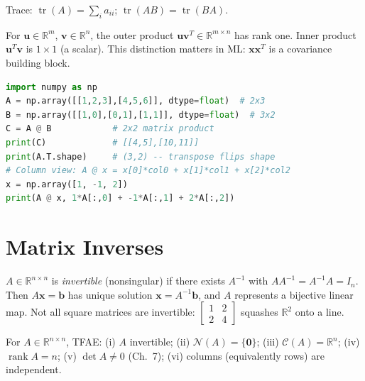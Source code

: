 Trace: $\operatorname{tr}(A)=\sum_i a_{ii}$; $\operatorname{tr}(AB)=\operatorname{tr}(BA)$.

\begin{example}
For $\mathbf{u}\in\mathbb{R}^m$, $\mathbf{v}\in\mathbb{R}^n$, the outer product $\mathbf{u}\mathbf{v}^T\in\mathbb{R}^{m\times n}$ has rank one. Inner product $\mathbf{u}^T\mathbf{v}$ is $1\times1$ (a scalar). This distinction matters in ML: $\mathbf{x}\mathbf{x}^T$ is a covariance building block.
\end{example}

\begin{example}
\begin{lstlisting}[language=Python]
import numpy as np
A = np.array([[1,2,3],[4,5,6]], dtype=float)  # 2x3
B = np.array([[1,0],[0,1],[1,1]], dtype=float)  # 3x2
C = A @ B            # 2x2 matrix product
print(C)             # [[4,5],[10,11]]
print(A.T.shape)     # (3,2) -- transpose flips shape
# Column view: A @ x = x[0]*col0 + x[1]*col1 + x[2]*col2
x = np.array([1, -1, 2])
print(A @ x, 1*A[:,0] + -1*A[:,1] + 2*A[:,2])
\end{lstlisting}
\end{example}


\section{Matrix Inverses}
\label{sec:inverses}
$A\in\mathbb{R}^{n\times n}$ is \emph{invertible} (nonsingular) if there exists $A^{-1}$ with $AA^{-1}=A^{-1}A=I_n$. Then $A\mathbf{x}=\mathbf{b}$ has unique solution $\mathbf{x}=A^{-1}\mathbf{b}$, and $A$ represents a bijective linear map. Not all square matrices are invertible: $\begin{bmatrix}1&2\\2&4\end{bmatrix}$ squashes $\mathbb{R}^2$ onto a line.

\begin{theorem}
For $A\in\mathbb{R}^{n\times n}$, TFAE: (i) $A$ invertible; (ii) $\mathcal{N}(A)=\{\mathbf{0}\}$; (iii) $\mathcal{C}(A)=\mathbb{R}^n$; (iv) $\operatorname{rank}A=n$; (v) $\det A\neq0$ (Ch.~7); (vi) columns (equivalently rows) are independent.
\end{theorem}

